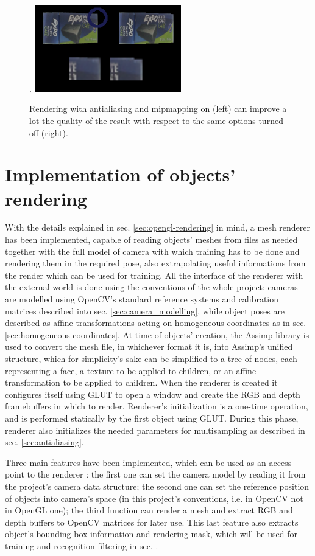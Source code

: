 \begin{figure}[htbp] \label{fig:multisampling-on}.
  \centering
  \includegraphics[width=2.5in]{./Results/antialiasing}
  \caption{Rendering with antialiasing and mipmapping on (left)
  can improve a lot the quality of the result with respect to the same options
turned off (right).}
\end{figure}

\section{Implementation of objects' rendering} \label{sec:renderer3d}
With the details explained in sec. \ref{sec:opengl-rendering} in mind, a mesh renderer has been implemented, capable of
reading objects' meshes from files as needed together with the full model of
camera with which training has to be done and rendering them in the required
pose, also extrapolating useful informations from the render which can be used
for training. All the interface of the renderer with the external world is done
using the conventions of the whole project: cameras are modelled using OpenCV's
standard reference systems and calibration matrices described into sec.
\ref{sec:camera_modelling}, while object poses are described as affine
transformations acting on homogeneous coordinates as in sec.
\ref{sec:homogeneous-coordinates}. At time of objects' creation, the Assimp library
is used to convert the mesh file, in whichever format it is, into Assimp's
unified structure, which for simplicity's sake can be simplified to a tree of
nodes, each representing a face, a texture to be applied to children, or
an affine transformation to be applied to children. When the renderer is created
it configures itself using GLUT to open a window and create the RGB and depth
framebuffers in which to render. Renderer's initialization is a one-time
operation, and is performed statically by the first object using GLUT. During
this phase, renderer also initializes the needed parameters for multisampling as
described in sec. \ref{sec:antialiasing}.

Three main features have been implemented, which can be used as an access point
to the renderer : the first one can set the
camera model by reading it from the project's camera data structure; the second
one can set the reference position of objects into camera's space (in this project's
conventions, i.e. in OpenCV not in OpenGL one); the third function can render a
mesh and extract RGB and depth buffers to OpenCV matrices for later use. This
last feature also extracts object's bounding box information and rendering mask,
which will be used for training and recognition filtering in sec.
\label{sec:vision}.

